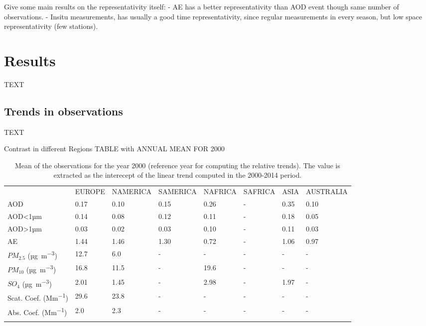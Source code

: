 \documentclass[journal abbreviation, manuscript]{copernicus}
\begin{document}
Give some main results on the representativity itself:
- AE has a better representativity than AOD event though same number of observations.
- Insitu measurements, has usually a good time representativity, since regular measurements in every season, but low space representativity (few stations).


\section{Results}
TEXT

\subsection{Trends in observations}
TEXT

Contrast in different Regions
TABLE with ANNUAL MEAN FOR 2000

\begin{table}
 \begin{tabular}{llllllll}
  \tophline
                                & EUROPE & NAMERICA & SAMERICA & NAFRICA & SAFRICA & ASIA & AUSTRALIA \\
  \middlehline
  AOD                           & 0.17   & 0.10     & 0.15     & 0.26    & -       & 0.35 & 0.10      \\
  AOD<1µm                       & 0.14   & 0.08     & 0.12     & 0.11    & -       & 0.18 & 0.05      \\
  AOD>1µm                       & 0.03   & 0.02     & 0.03     & 0.10    & -       & 0.11 & 0.03      \\
  AE                            & 1.44   & 1.46     & 1.30     & 0.72    & -       & 1.06 & 0.97      \\
  $PM_{2.5}$ (\unit{µg.m^{-3}}) & 12.7   & 6.0      & -        & -       & -       & -    & -         \\
  $PM_{10}$ (\unit{µg.m^{-3}})  & 16.8   & 11.5     & -        & 19.6    & -       & -    & -         \\
  $SO_{4}$ (\unit{µg.m^{-3}})   & 2.01   & 1.45     & -        & 2.98    & -       & 1.97 & -         \\
  Scat. Coef. (\unit{Mm^{-1}})  & 29.6   & 23.8     & -        & -       & -       & -    & -         \\
  Abs. Coef. (\unit{Mm^{-1}})   & 2.0    & 2.3      & -        & -       & -       & -    & -         \\
  \bottomhline
 \end{tabular}

 \caption{Mean of the observations for the year 2000 (reference year for computing the relative trends). The value is extracted as the interecept of the linear trend computed in the 2000-2014 period.}
 \label{meanobs_2000}
\end{table}
\end{document}
